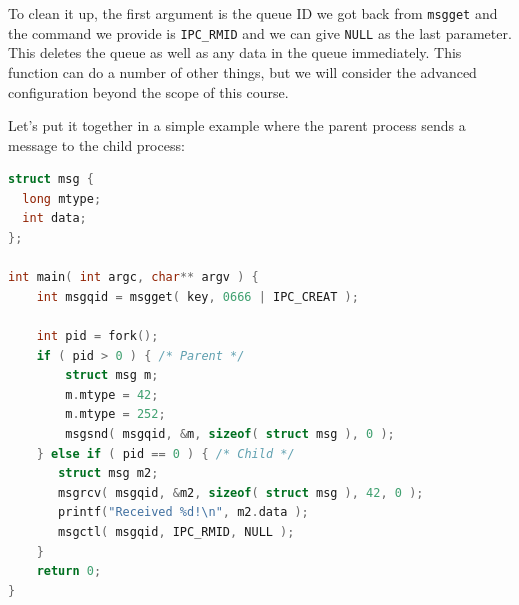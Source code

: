 To clean it up, the first argument is the queue ID we got back from \texttt{msgget} and the command we provide is \texttt{IPC\_RMID} and we can give \texttt{NULL} as the last parameter. This deletes the queue as well as any data in the queue immediately. This function can do a number of other things, but we will consider the advanced configuration beyond the scope of this course.

Let's put it together in a simple example where the parent process sends a message to the child process:
\begin{lstlisting}[language=C]
struct msg {
  long mtype;
  int data;
};
  
int main( int argc, char** argv ) {
    int msgqid = msgget( key, 0666 | IPC_CREAT );

    int pid = fork();
    if ( pid > 0 ) { /* Parent */
        struct msg m;
        m.mtype = 42;
        m.mtype = 252;
        msgsnd( msgqid, &m, sizeof( struct msg ), 0 ); 
    } else if ( pid == 0 ) { /* Child */
       struct msg m2;
       msgrcv( msgqid, &m2, sizeof( struct msg ), 42, 0 );
       printf("Received %d!\n", m2.data );
       msgctl( msgqid, IPC_RMID, NULL );
    }   
    return 0;
}
\end{lstlisting}




